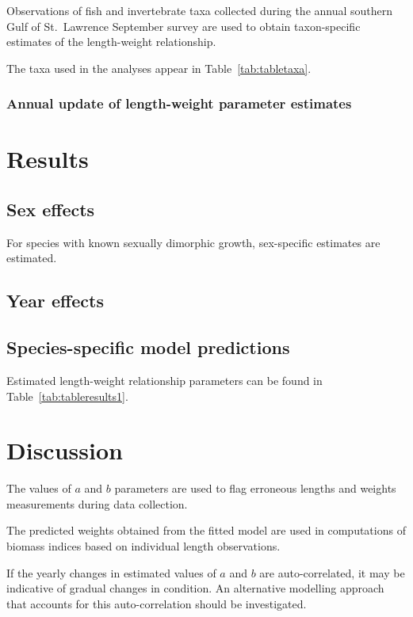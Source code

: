 \documentclass[12pt]{article}\usepackage[]{graphicx}\usepackage[]{color}
\begin{document}
Observations of fish and invertebrate taxa collected during the annual southern Gulf of St.~Lawrence September survey are used to obtain taxon-specific estimates of the length-weight relationship.

The taxa used in the analyses appear in Table~\ref{tab:tabletaxa}.

\subsubsection{Annual update of length-weight parameter estimates}\label{annual-update-of-length-weight-parameter-estimates}

\section{Results}\label{results}

\subsection{Sex effects}\label{sex-effects}

For species with known sexually dimorphic growth, sex-specific estimates are estimated.

\subsection{Year effects}\label{year-effects}

\subsection{Species-specific model predictions}\label{species-specific-model-predictions}

Estimated length-weight relationship parameters can be found in Table~\ref{tab:tableresults1}.

\section{Discussion}\label{discussion}

The values of \(a\) and \(b\) parameters are used to flag erroneous lengths and weights measurements during data collection.

The predicted weights obtained from the fitted model are used in computations of biomass indices based on individual length observations.

If the yearly changes in estimated values of \(a\) and \(b\) are auto-correlated, it may be indicative of gradual changes in condition. An alternative modelling approach that accounts for this auto-correlation should be investigated.
\end{document}
